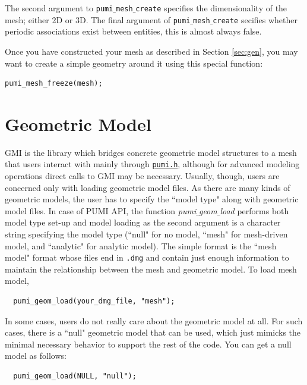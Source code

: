 \documentclass{article}
\begin{document}
The second argument to \texttt{pumi$\_$mesh$\_$create}
specifies the dimensionality of the mesh; either 2D or 3D.
The final argument of \texttt{pumi$\_$mesh$\_$create} secifies
whether periodic associations exist between entities, this is
almost always false.

Once you have constructed your mesh as described in Section \ref{sec:gen},
you may want to create a simple geometry around it using
this special function:

\begin{lstlisting}
pumi_mesh_freeze(mesh);
\end{lstlisting}

\section{Geometric Model}
\label{sec:gmi}

GMI is the library which bridges concrete geometric model structures
to a mesh that users interact with mainly through \href{https://github.com/SCOREC/core/blob/master/pumi/pumi.h}{\texttt{pumi.h}}, although
for advanced modeling operations direct calls to GMI may be necessary.
Usually, though, users are concerned only with loading geometric model
files.
As there are many kinds of geometric models, the user has to specify the ``model type" along with geometric model files. In case of PUMI API, the function \emph{pumi$\_$geom$\_$load} performs both model type set-up and model loading as the second argument is a character string specifying the model type (``null" for no model, ``mesh" for mesh-driven model, and ``analytic" for analytic model). The simple format is the ``mesh model" format whose files end in
\texttt{.dmg} and contain just enough information to maintain
the relationship between the mesh and geometric model.
To load mesh model, 

\begin{lstlisting}
  pumi_geom_load(your_dmg_file, "mesh");
\end{lstlisting}

In some cases, users do not really care about the geometric model at
all.
For such cases, there is a ``null" geometric model that can be used,
which just mimicks the minimal necessary behavior to support
the rest of the code.
You can get a null model as follows:

\begin{lstlisting}
  pumi_geom_load(NULL, "null");
\end{lstlisting}
\end{document}
